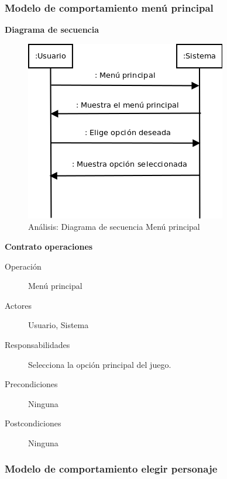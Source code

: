 \subsubsection{Modelo de comportamiento menú principal}

\textbf{Diagrama de secuencia}
\begin{figure}[H]
  \label{dia_menu_principal}
  \begin{center}
    \includegraphics[scale=0.5]{imagenes/dia_menu_principal.png}
  \end{center}
  \caption{Análisis: Diagrama de secuencia Menú principal}
\end{figure}

\textbf{Contrato operaciones}

\begin{description}
    \item[Operación] Menú principal
    \item[Actores] Usuario, Sistema
    \item[Responsabilidades] Selecciona la opción principal del juego.
    \item[Precondiciones] Ninguna
    \item[Postcondiciones] Ninguna
\end{description}

\subsubsection{Modelo de comportamiento elegir personaje}

